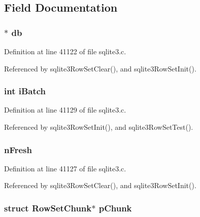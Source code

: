 \subsection{Field Documentation}
\hypertarget{struct_row_set_ad6e663497d2c934364b3bcf07496b30b}{}
\subsubsection[{db}]{$\ast$ db}\label{struct_row_set_ad6e663497d2c934364b3bcf07496b30b}


Definition at line 41122 of file sqlite3.\+c.



Referenced by sqlite3\+Row\+Set\+Clear(), and sqlite3\+Row\+Set\+Init().

\hypertarget{struct_row_set_a470e1d1ac2d44a676f33079ebb476813}{}
\subsubsection[{i\+Batch}]{\setlength{\rightskip}{0pt plus 5cm}int i\+Batch}\label{struct_row_set_a470e1d1ac2d44a676f33079ebb476813}


Definition at line 41129 of file sqlite3.\+c.



Referenced by sqlite3\+Row\+Set\+Init(), and sqlite3\+Row\+Set\+Test().

\hypertarget{struct_row_set_ac060d7edf593aa52dd662cfc33ca6631}{}
\subsubsection[{n\+Fresh}]{ n\+Fresh}\label{struct_row_set_ac060d7edf593aa52dd662cfc33ca6631}


Definition at line 41127 of file sqlite3.\+c.



Referenced by sqlite3\+Row\+Set\+Clear(), and sqlite3\+Row\+Set\+Init().

\hypertarget{struct_row_set_a1f15b1b441943e874ed1f8fa1ef56c06}{}
\subsubsection[{p\+Chunk}]{\setlength{\rightskip}{0pt plus 5cm}struct {\bf Row\+Set\+Chunk}$\ast$ p\+Chunk}\label{struct_row_set_a1f15b1b441943e874ed1f8fa1ef56c06}


